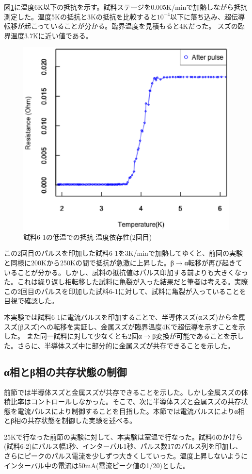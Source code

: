 図\ref{fig:181228_after_pulse}に温度6K以下の抵抗を示す。試料ステージを0.005K/minで加熱しながら抵抗測定した。温度5Kの抵抗と3Kの抵抗を比較すると$10^{-4}$以下に落ち込み、超伝導転移が起こっていることが分かる。臨界温度を見積もると4Kだった。
スズの臨界温度3.7Kに近い値である。
\begin{figure}[!h]
\begin{center}
   \includegraphics[width=0.5\hsize]{results_discussions/181228_after_pulse.eps}
  \end{center}
  \caption{試料6-1の低温での抵抗-温度依存性(2回目)}
  \label{fig:181228_after_pulse}
\end{figure}

この2回目のパルスを印加した試料6-1を3K/minで加熱してゆくと、前回の実験と同様に200Kから250Kの間で抵抗が急激に上昇した。β$\to$α転移が再び起きていることが分かる。しかし、試料の抵抗値はパルス印加する前よりも大きくなった。これは繰り返し相転移した試料に亀裂が入った結果だと筆者は考える。実際この2回目のパルスを印加した試料6-1に対して、試料に亀裂が入っていることを目視で確認した。

本実験では試料6-1に電流パルスを印加することで、半導体スズ(αスズ)から金属スズ(βスズ)への転移を実証し、金属スズが臨界温度4Kで超伝導を示すことを示した。
また同一試料に対して少なくとも2回α$\to$β変換が可能であることを示した。さらに、半導体スズ中に部分的に金属スズが共存できることを示した。

\subsection{α相とβ相の共存状態の制御}
前節では半導体スズと金属スズが共存できることを示した。しかし金属スズの体積比率はコントロールしなかった。そこで、次に半導体スズと金属スズの共存状態を電流パルスにより制御することを目指した。本節では電流パルスによりα相とβ相の共存状態を制御した実験を述べる。

25Kで行なった前節の実験に対して、本実験は室温で行なった。試料6のかけら(試料6-2)にパルス幅1秒、インターバル1秒、パルス数17のパルス列を印加し、さらにピークのパルス電流を少しずつ大きくしていった。温度上昇しないようにインターバル中の電流は50mA(電流ピーク値の1/20)とした。

